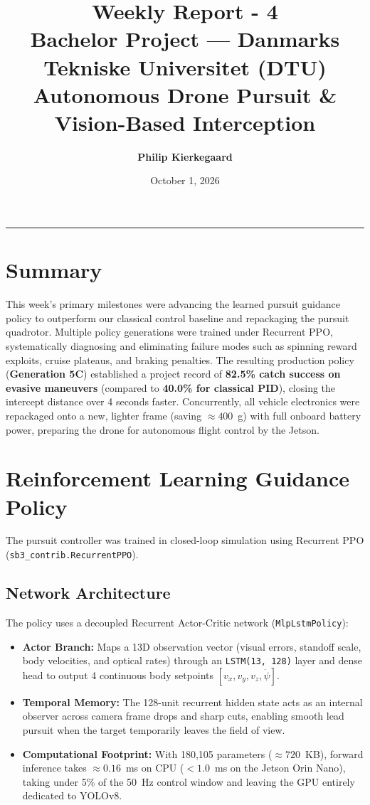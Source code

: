 \documentclass[11pt,a4paper]{article}
\title{\textbf{Weekly Report - 4}\\[0.2em]
\large Bachelor Project --- Danmarks Tekniske Universitet (DTU)\\[0.1em]
\normalsize Autonomous Drone Pursuit \& Vision-Based Interception}
\author{\textbf{Philip Kierkegaard}}
\date{October 1, 2026}
\begin{document}
\maketitle

\vspace{-1.5em}
\noindent\rule{\textwidth}{0.4pt}

\section*{Summary}
This week's primary milestones were advancing the learned pursuit guidance policy to outperform our classical control baseline and repackaging the pursuit quadrotor. Multiple policy generations were trained under Recurrent PPO, systematically diagnosing and eliminating failure modes such as spinning reward exploits, cruise plateaus, and braking penalties. The resulting production policy (\textbf{Generation 5C}) established a project record of \textbf{82.5\% catch success on evasive maneuvers} (compared to \textbf{40.0\% for classical PID}), closing the intercept distance over 4 seconds faster. Concurrently, all vehicle electronics were repackaged onto a new, lighter frame (saving $\approx 400$~g) with full onboard battery power, preparing the drone for autonomous flight control by the Jetson.

\section{Reinforcement Learning Guidance Policy}
The pursuit controller was trained in closed-loop simulation using Recurrent PPO (\texttt{sb3\_contrib.RecurrentPPO}).

\subsection{Network Architecture}
The policy uses a decoupled Recurrent Actor-Critic network (\texttt{MlpLstmPolicy}):
\begin{itemize}[leftmargin=1.5em, itemsep=0.2em]
    \item \textbf{Actor Branch:} Maps a 13D observation vector (visual errors, standoff scale, body velocities, and optical rates) through an \texttt{LSTM(13, 128)} layer and dense head to output 4 continuous body setpoints $[v_x, v_y, v_z, \dot{\psi}]$.
    \item \textbf{Temporal Memory:} The 128-unit recurrent hidden state acts as an internal observer across camera frame drops and sharp cuts, enabling smooth lead pursuit when the target temporarily leaves the field of view.
    \item \textbf{Computational Footprint:} With 180,105 parameters ($\approx 720$~KB), forward inference takes $\approx 0.16$~ms on CPU ($< 1.0$~ms on the Jetson Orin Nano), taking under 5\% of the 50~Hz control window and leaving the GPU entirely dedicated to YOLOv8.
\end{itemize}
\end{document}
